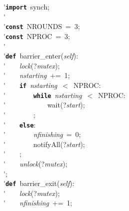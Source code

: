 \'\>\texttt{\textbf{import}}~synch;\\

\'\>\\

\'\>\texttt{\textbf{const}}~NROUNDS~=~3;\\

\'\>\texttt{\textbf{const}}~NPROC~=~3;\\

\'\>\\

\'\>\texttt{\textbf{def}}~barrier\_enter(\textit{self}):\\

\'\>~~~~\textit{lock}(?\textit{mutex});\\

\'\>~~~~\textit{nstarting}~+=~1;\\

\'\>~~~~\texttt{\textbf{if}}~\textit{nstarting}~$<$~NPROC:\\

\'\>~~~~~~~~\texttt{\textbf{while}}~\textit{nstarting}~$<$~NPROC:\\

\'\>~~~~~~~~~~~~wait(?\textit{start});\\

\'\>~~~~~~~~;\\

\'\>~~~~\texttt{\textbf{else}}:\\

\'\>~~~~~~~~\textit{nfinishing}~=~0;\\

\'\>~~~~~~~~notifyAll(?\textit{start});\\

\'\>~~~~;\\

\'\>~~~~\textit{unlock}(?\textit{mutex});\\

\'\>;\\

\'\>\texttt{\textbf{def}}~barrier\_exit(\textit{self}):\\

\'\>~~~~\textit{lock}(?\textit{mutex});\\

\'\>~~~~\textit{nfinishing}~+=~1;\\

